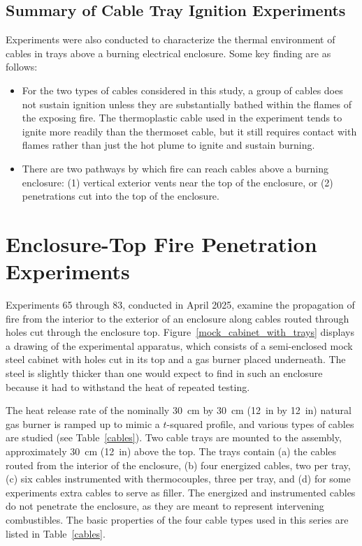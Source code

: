\clearpage


\subsection{Summary of Cable Tray Ignition Experiments}


Experiments were also conducted to characterize the thermal environment of cables in trays above a burning electrical enclosure. Some key finding are as follows:
\begin{itemize}
\item For the two types of cables considered in this study, a group of cables does not sustain ignition unless they are substantially bathed within the flames of the exposing fire. The thermoplastic cable used in the experiment tends to ignite more readily than the thermoset cable, but it still requires contact with flames rather than just the hot plume to ignite and sustain burning.
\item There are two pathways by which fire can reach cables above a burning enclosure: (1) vertical exterior vents near the top of the enclosure, or (2) penetrations cut into the top of the enclosure.
\end{itemize}


\clearpage

\section{Enclosure-Top Fire Penetration Experiments}

Experiments 65 through 83, conducted in April 2025, examine the propagation of fire from the interior to the exterior of an enclosure along cables routed through holes cut through the enclosure top. Figure~\ref{mock_cabinet_with_trays} displays a drawing of the experimental apparatus, which consists of a semi-enclosed mock steel cabinet with holes cut in its top and a gas burner placed underneath. The steel is slightly thicker than one would expect to find in such an enclosure because it had to withstand the heat of repeated testing.

The heat release rate of the nominally 30~cm by 30~cm (12~in by 12~in) natural gas burner is ramped up to mimic a $t$-squared profile, and various types of cables are studied (see Table~\ref{cables}). Two cable trays are mounted to the assembly, approximately 30~cm (12~in) above the top. The trays contain (a) the cables routed from the interior of the enclosure, (b) four energized cables, two per tray, (c) six cables instrumented with thermocouples, three per tray, and (d) for some experiments extra cables to serve as filler. The energized and instrumented cables do not penetrate the enclosure, as they are meant to represent intervening combustibles. The basic properties of the four cable types used in this series are listed in Table~\ref{cables}.

